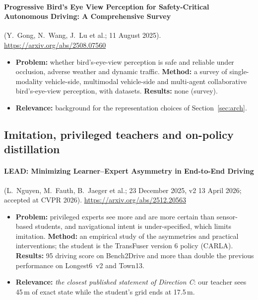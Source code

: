 \paragraph{Progressive Bird's Eye View Perception for Safety-Critical Autonomous Driving: A Comprehensive Survey} (Y.~Gong, N.~Wang, J.~Lu et al.; 11 August 2025). \url{https://arxiv.org/abs/2508.07560}
\begin{itemize}
\item \textbf{Problem:} whether bird's-eye-view perception is safe and reliable under occlusion, adverse weather and dynamic traffic. \textbf{Method:} a survey of single-modality vehicle-side, multimodal vehicle-side and multi-agent collaborative bird's-eye-view perception, with datasets. \textbf{Results:} none (survey).
\item \textbf{Relevance:} background for the representation choices of Section~\ref{sec:arch}.
\end{itemize}

\subsection{Imitation, privileged teachers and on-policy distillation}

\paragraph{LEAD: Minimizing Learner--Expert Asymmetry in End-to-End Driving} (L.~Nguyen, M.~Fauth, B.~Jaeger et al.; 23 December 2025, v2 13 April 2026; accepted at CVPR 2026). \url{https://arxiv.org/abs/2512.20563}
\begin{itemize}
\item \textbf{Problem:} privileged experts see more and are more certain than sensor-based students, and navigational intent is under-specified, which limits imitation. \textbf{Method:} an empirical study of the asymmetries and practical interventions; the student is the TransFuser version 6 policy (CARLA). \textbf{Results:} 95 driving score on Bench2Drive and more than double the previous performance on Longest6~v2 and Town13.
\item \textbf{Relevance:} \emph{the closest published statement of Direction C}: our teacher sees 45\,m of exact state while the student's grid ends at 17.5\,m.
\end{itemize}

